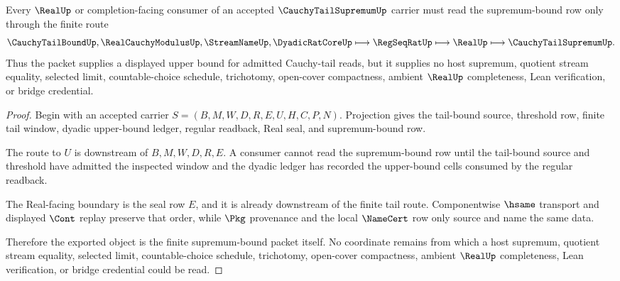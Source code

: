 \begin{theorem}
\label{thm:cauchy-tail-supremum-real-boundary}
Every $\RealUp$ or completion-facing consumer of an accepted $\CauchyTailSupremumUp$ carrier must read the supremum-bound row only through the finite route
$$
\CauchyTailBoundUp,\RealCauchyModulusUp,\StreamNameUp,\DyadicRatCoreUp
\longmapsto
\RegSeqRatUp
\longmapsto
\RealUp
\longmapsto
\CauchyTailSupremumUp .
$$
Thus the packet supplies a displayed upper bound for admitted Cauchy-tail reads, but it supplies no host supremum, quotient stream equality, selected limit, countable-choice schedule, trichotomy, open-cover compactness, ambient $\RealUp$ completeness, Lean verification, or bridge credential.
\end{theorem}
\begin{proof}
Begin with an accepted carrier $S=(B,M,W,D,R,E,U,H,C,P,N)$. Projection gives the tail-bound source, threshold row, finite tail window, dyadic upper-bound ledger, regular readback, Real seal, and supremum-bound row.

The route to $U$ is downstream of $B,M,W,D,R,E$. A consumer cannot read the supremum-bound row until the tail-bound source and threshold have admitted the inspected window and the dyadic ledger has recorded the upper-bound cells consumed by the regular readback.

The Real-facing boundary is the seal row $E$, and it is already downstream of the finite tail route. Componentwise $\hsame$ transport and displayed $\Cont$ replay preserve that order, while $\Pkg$ provenance and the local $\NameCert$ row only source and name the same data.

Therefore the exported object is the finite supremum-bound packet itself. No coordinate remains from which a host supremum, quotient stream equality, selected limit, countable-choice schedule, trichotomy, open-cover compactness, ambient $\RealUp$ completeness, Lean verification, or bridge credential could be read.
\end{proof}


